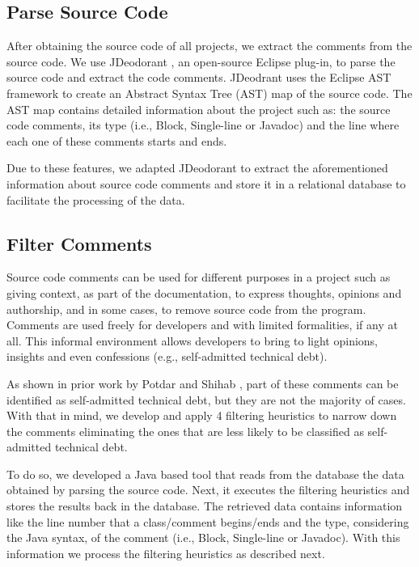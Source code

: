 \subsection{Parse Source Code} %
\label{sub:parse_source_code}

After obtaining the source code of all projects, we extract the comments from the source code. We use JDeodorant \cite{Tsantalis2008CSMR}, an open-source Eclipse plug-in, to parse the source code and extract the code comments. JDeodrant uses the Eclipse AST framework to create an Abstract Syntax Tree (AST) map of the source code. The AST map contains detailed information about the project such as: the source code comments, its type (i.e., Block, Single-line or Javadoc) and the line where each one of these comments starts and ends. 

Due to these features, we adapted JDeodorant to extract the aforementioned information about source code comments and store it in a relational database to facilitate the processing of the data.

\subsection{Filter Comments} %
\label{sub:filter_comments}

Source code comments can be used for different purposes in a project such as giving context, as part of the documentation, to express thoughts, opinions and authorship, and in some cases, to remove source code from the program. Comments are used freely for developers and with limited formalities, if any at all. This informal environment allows developers to bring to light opinions, insights and even confessions (e.g., self-admitted technical debt). 

As shown in prior work by Potdar and Shihab \cite{Potdar2014ICSME}, part of these comments can be identified as self-admitted technical debt, but they are not the majority of cases. With that in mind, we develop and apply 4 filtering heuristics to narrow down the comments eliminating the ones that are less likely to be classified as self-admitted technical debt.

To do so, we developed a Java based tool that reads from the database the data obtained by parsing the source code. Next, it executes the filtering heuristics and stores the results back in the database. The retrieved data contains information like the line number that a class/comment begins/ends and the type, considering the Java syntax, of the comment (i.e., Block, Single-line or Javadoc). With this information we process the filtering heuristics as described next.

